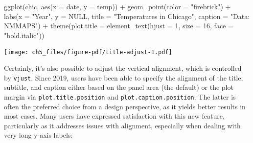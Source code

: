 \documentclass[
  letterpaper,
]{scrbook}
\newenvironment{Shaded}{\begin{snugshade}}{\end{snugshade}}
\newcommand{\AttributeTok}[1]{\textcolor[rgb]{0.40,0.45,0.13}{#1}}
\newcommand{\ConstantTok}[1]{\textcolor[rgb]{0.56,0.35,0.01}{#1}}
\newcommand{\DecValTok}[1]{\textcolor[rgb]{0.68,0.00,0.00}{#1}}
\newcommand{\FunctionTok}[1]{\textcolor[rgb]{0.28,0.35,0.67}{#1}}
\newcommand{\NormalTok}[1]{\textcolor[rgb]{0.00,0.23,0.31}{#1}}
\newcommand{\SpecialCharTok}[1]{\textcolor[rgb]{0.37,0.37,0.37}{#1}}
\newcommand{\StringTok}[1]{\textcolor[rgb]{0.13,0.47,0.30}{#1}}
\begin{document}
\begin{Shaded}
\begin{Highlighting}[]
\FunctionTok{ggplot}\NormalTok{(chic, }\FunctionTok{aes}\NormalTok{(}\AttributeTok{x =}\NormalTok{ date, }\AttributeTok{y =}\NormalTok{ temp)) }\SpecialCharTok{+}
  \FunctionTok{geom\_point}\NormalTok{(}\AttributeTok{color =} \StringTok{"firebrick"}\NormalTok{) }\SpecialCharTok{+}
  \FunctionTok{labs}\NormalTok{(}\AttributeTok{x =} \StringTok{"Year"}\NormalTok{, }\AttributeTok{y =} \ConstantTok{NULL}\NormalTok{,}
       \AttributeTok{title =} \StringTok{"Temperatures in Chicago"}\NormalTok{,}
       \AttributeTok{caption =} \StringTok{"Data: NMMAPS"}\NormalTok{) }\SpecialCharTok{+}
  \FunctionTok{theme}\NormalTok{(}\AttributeTok{plot.title =} \FunctionTok{element\_text}\NormalTok{(}\AttributeTok{hjust =} \DecValTok{1}\NormalTok{, }\AttributeTok{size =} \DecValTok{16}\NormalTok{, }\AttributeTok{face =} \StringTok{"bold.italic"}\NormalTok{))}
\end{Highlighting}
\end{Shaded}

\texttt{[image: ch5\_files/figure-pdf/title-adjust-1.pdf]}

Certainly, it's also possible to adjust the vertical alignment, which is
controlled by \texttt{vjust}. Since 2019, users have been able to
specify the alignment of the title, subtitle, and caption either based
on the panel area (the default) or the plot margin via
\texttt{plot.title.position} and \texttt{plot.caption.position}. The
latter is often the preferred choice from a design perspective, as it
yields better results in most cases. Many users have expressed
satisfaction with this new feature, particularly as it addresses issues
with alignment, especially when dealing with very long y-axis labels:
\end{document}
